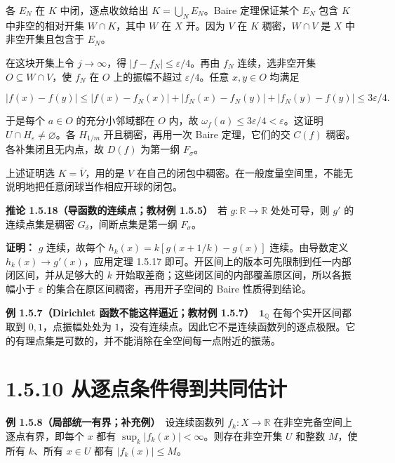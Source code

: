 \documentclass[11pt,a4paper]{article}
\begin{document}
各 \(E_N\) 在 \(K\) 中闭，逐点收敛给出 \(K=\bigcup_NE_N\)。Baire
定理保证某个 \(E_N\) 包含 \(K\) 中非空的相对开集 \(W\cap K\)，其中 \(W\)
在 \(X\) 开。因为 \(V\) 在 \(K\) 稠密，\(W\cap V\) 是 \(X\)
中非空开集且包含于 \(E_N\)。

在这块开集上令 \(j\to\infty\)，得 \(|f-f_N|\le\varepsilon/4\)。再由
\(f_N\) 连续，选非空开集 \(O\subseteq W\cap V\)，使 \(f_N\) 在 \(O\)
上的振幅不超过 \(\varepsilon/4\)。任意 \(x,y\in O\) 均满足

\begin{equation*}
|f(x)-f(y)|\le |f(x)-f_N(x)|+|f_N(x)-f_N(y)|+|f_N(y)-f(y)|\le3\varepsilon/4.
\tag{1.5.16}
\end{equation*}

于是每个 \(a\in O\) 的充分小邻域都在 \(O\) 内，故
\(\omega_f(a)\le3\varepsilon/4<\varepsilon\)。这证明
\(U\cap H_\varepsilon\ne\varnothing\)。各 \(H_{1/m}\) 开且稠密，再用一次
Baire 定理，它们的交 \(C(f)\) 稠密。各补集闭且无内点，故 \(D(f)\)
为第一纲 \(F_\sigma\)。

上述证明选 \(K=\overline V\)，用的是 \(V\)
在自己的闭包中稠密。在一般度量空间里，不能无说明地把任意闭球当作相应开球的闭包。

\textbf{推论 1.5.18（导函数的连续点；教材例 1.5.5）}　若
\(g:\mathbb R\to\mathbb R\) 处处可导，则 \(g'\) 的连续点集是稠密
\(G_\delta\)，间断点集是第一纲 \(F_\sigma\)。

\textbf{证明：} \(g\) 连续，故每个 \(h_k(x)=k[g(x+1/k)-g(x)]\)
连续。由导数定义 \(h_k(x)\to g'(x)\)，应用定理 1.5.17
即可。开区间上的版本可先限制到任一内部闭区间，并从足够大的 \(k\)
开始取差商；这些闭区间的内部覆盖原区间，所以各振幅小于 \(\varepsilon\)
的集合在原区间稠密，再用开子空间的 Baire 性质得到结论。

\textbf{例 1.5.7（Dirichlet 函数不能这样逼近；教材例
1.5.7）}　\(\mathbf1_{\mathbb Q}\) 在每个实开区间都取到
\(0,1\)，点振幅处处为
\(1\)，没有连续点。因此它不是连续函数列的逐点极限。它的有理点集是可数的，并不能消除在全空间每一点附近的振荡。

\section[\S{}1.5.10
从逐点条件得到共同估计]{1.5.10
从逐点条件得到共同估计}\label{ux4eceux9010ux70b9ux6761ux4ef6ux5f97ux5230ux5171ux540cux4f30ux8ba1}

\textbf{例 1.5.8（局部统一有界；补充例）}　设连续函数列
\(f_k:X\to\mathbb R\) 在非空完备空间上逐点有界，即每个 \(x\) 都有
\(\sup_k|f_k(x)|<\infty\)。则存在非空开集 \(U\) 和整数 \(M\)，使所有
\(k\)、所有 \(x\in U\) 都有 \(|f_k(x)|\le M\)。
\end{document}
